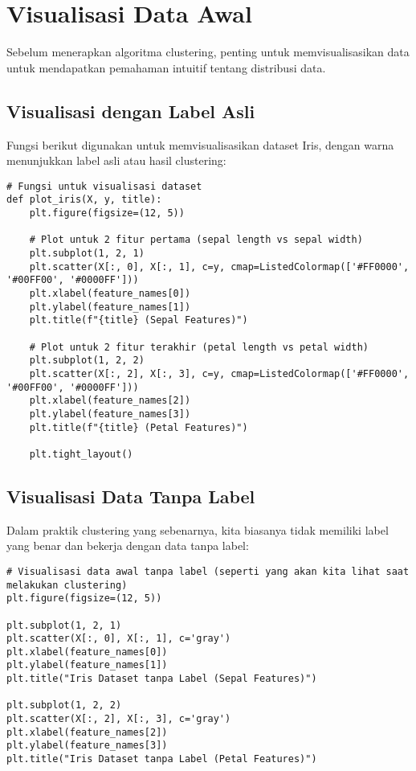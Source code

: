 \documentclass[a4paper,12pt]{article}
\begin{document}
\section{Visualisasi Data Awal}
Sebelum menerapkan algoritma clustering, penting untuk memvisualisasikan data untuk mendapatkan pemahaman intuitif tentang distribusi data.

\subsection{Visualisasi dengan Label Asli}
Fungsi berikut digunakan untuk memvisualisasikan dataset Iris, dengan warna menunjukkan label asli atau hasil clustering:
\begin{lstlisting}
# Fungsi untuk visualisasi dataset
def plot_iris(X, y, title):
    plt.figure(figsize=(12, 5))
    
    # Plot untuk 2 fitur pertama (sepal length vs sepal width)
    plt.subplot(1, 2, 1)
    plt.scatter(X[:, 0], X[:, 1], c=y, cmap=ListedColormap(['#FF0000', '#00FF00', '#0000FF']))
    plt.xlabel(feature_names[0])
    plt.ylabel(feature_names[1])
    plt.title(f"{title} (Sepal Features)")
    
    # Plot untuk 2 fitur terakhir (petal length vs petal width)
    plt.subplot(1, 2, 2)
    plt.scatter(X[:, 2], X[:, 3], c=y, cmap=ListedColormap(['#FF0000', '#00FF00', '#0000FF']))
    plt.xlabel(feature_names[2])
    plt.ylabel(feature_names[3])
    plt.title(f"{title} (Petal Features)")
    
    plt.tight_layout()
\end{lstlisting}

\subsection{Visualisasi Data Tanpa Label}
Dalam praktik clustering yang sebenarnya, kita biasanya tidak memiliki label yang benar dan bekerja dengan data tanpa label:
\begin{lstlisting}
# Visualisasi data awal tanpa label (seperti yang akan kita lihat saat melakukan clustering)
plt.figure(figsize=(12, 5))

plt.subplot(1, 2, 1)
plt.scatter(X[:, 0], X[:, 1], c='gray')
plt.xlabel(feature_names[0])
plt.ylabel(feature_names[1])
plt.title("Iris Dataset tanpa Label (Sepal Features)")

plt.subplot(1, 2, 2)
plt.scatter(X[:, 2], X[:, 3], c='gray')
plt.xlabel(feature_names[2])
plt.ylabel(feature_names[3])
plt.title("Iris Dataset tanpa Label (Petal Features)")
\end{lstlisting}
\end{document}
